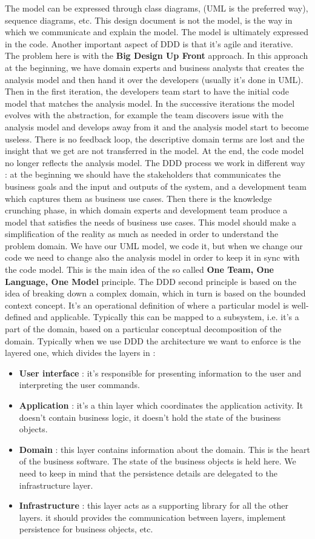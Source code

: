 The model can be expressed through class diagrams, (UML is the preferred way), sequence diagrams, etc. This design document is not the model, is the way in which we communicate and explain the model. The model is ultimately expressed in the code. Another important aspect of DDD is that it's agile and iterative. The problem here is with the \textbf{Big Design Up Front} approach. In this approach at the beginning, we have domain experts and business analysts that creates the analysis model and then hand it over the developers (usually it's done in UML). Then in the first iteration, the developers team start to have the initial code model that matches the analysis model. In the successive iterations the model evolves with the abstraction, for example the team discovers issue with the analysis model and develops away from it and the analysis model start to become useless. There is no feedback loop, the descriptive domain terms are lost and the insight that we get are not transferred in the model. At the end, the code model no longer reflects the analysis model. The DDD process we work in different way : at the beginning we should have the stakeholders that communicates the business goals and the input and outputs of the system, and a development team which captures them as business use cases. Then there is the knowledge crunching phase, in which domain experts and development team produce a model that satisfies the needs of business use cases. This model should make a simplification of the reality as much as needed in order to understand the problem domain. We have our UML model, we code it, but when we change our code we need to change also the analysis model in order to keep it in sync with the code model. This is the main idea of the so called \textbf{One Team, One Language, One Model} principle. The DDD second principle is based on the idea of breaking down a complex domain, which in turn is based on the bounded context concept. It's an operational definition of where a particular model is well-defined and applicable. Typically this can be mapped to a subsystem, i.e. it's a part of the domain, based on a particular conceptual decomposition of the domain. Typically when we use DDD the architecture we want to enforce is the layered one, which divides the layers in :
\begin{itemize}
    \item \textbf{User interface} : it's responsible for presenting information to the user and interpreting the user commands.
    \item \textbf{Application} : it's a thin layer which coordinates  the application activity. It doesn't contain business logic, it doesn't hold the state of the business objects.
    \item \textbf{Domain} : this layer contains information about the domain. This is the heart of the business software. The state of the business objects is held here. We need to keep in mind that the persistence details are delegated to the infrastructure layer.
    \item \textbf{Infrastructure} : this layer acts as a supporting library for all the other layers. it should provides the communication between layers, implement persistence for business objects, etc.
\end{itemize}
